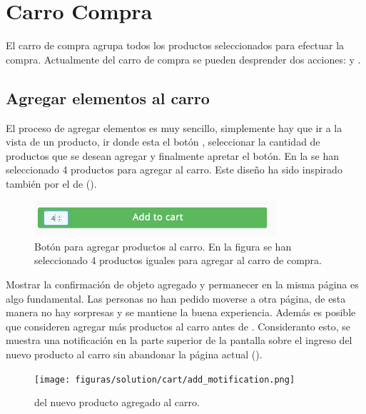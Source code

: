 \section{Carro Compra}
	El carro de compra agrupa todos los productos seleccionados para efectuar la compra. Actualmente del carro de compra se pueden desprender dos acciones:  y .

	\subsection{Agregar elementos al carro}\label{chapter:section:carro_compra:subsection:add}

		El proceso de agregar elementos es muy sencillo, simplemente hay que ir a la vista de un producto, ir donde esta el botón \addtocartLABEL, seleccionar la cantidad de productos que se desean agregar y finalmente apretar el botón. En la  se han seleccionado 4 productos para agregar al carro. Este diseño ha sido inspirado también por el \websiteINT de \shopifyNAME ().

		\begin{figure}[H]
			\centering
			\includegraphics[width=0.8\textwidth]{figuras/solution/cart/button.png}
			\caption{Botón para agregar productos al carro. En la figura se han seleccionado 4 productos iguales para agregar al carro de compra.}
			\label{figure:solution:cart:button}
		\end{figure}

		Mostrar la confirmación de objeto agregado y permanecer en la misma página es algo fundamental. Las personas no han pedido moverse a otra página, de esta manera no hay sorpresas y se mantiene la buena experiencia. Además es posible que consideren agregar más productos al carro antes de \checkoutCOM \cite{online_official_conversionxl_checkout_flow}. Consideranto esto, se muestra una notificación en la parte superior de la pantalla sobre el ingreso del nuevo producto al carro sin abandonar la página actual ().

		\begin{figure}[H]
			\centering
			\texttt{[image: figuras/solution/cart/add\_motification.png]}
			\caption{\FeedbackCPT del nuevo producto agregado al carro.}
			\label{figure:solution:cart:add_motification}
		\end{figure}

